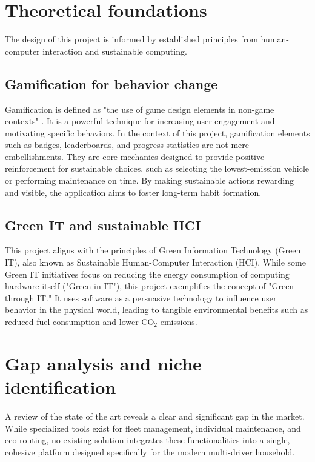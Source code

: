 \section{Theoretical foundations}

The design of this project is informed by established principles from human-computer interaction and sustainable computing.

\subsection{Gamification for behavior change}
Gamification is defined as "the use of game design elements in non-game contexts" \cite{deterding2011gamification}. It is a powerful technique for increasing user engagement and motivating specific behaviors. In the context of this project, gamification elements such as badges, leaderboards, and progress statistics are not mere embellishments. They are core mechanics designed to provide positive reinforcement for sustainable choices, such as selecting the lowest-emission vehicle or performing maintenance on time. By making sustainable actions rewarding and visible, the application aims to foster long-term habit formation.

\subsection{Green IT and sustainable HCI}
This project aligns with the principles of Green Information Technology (Green IT), also known as Sustainable Human-Computer Interaction (HCI). While some Green IT initiatives focus on reducing the energy consumption of computing hardware itself ("Green in IT"), this project exemplifies the concept of "Green through IT." It uses software as a persuasive technology to influence user behavior in the physical world, leading to tangible environmental benefits such as reduced fuel consumption and lower CO$_2$ emissions.

\section{Gap analysis and niche identification}

A review of the state of the art reveals a clear and significant gap in the market. While specialized tools exist for fleet management, individual maintenance, and eco-routing, no existing solution integrates these functionalities into a single, cohesive platform designed specifically for the modern multi-driver household.

